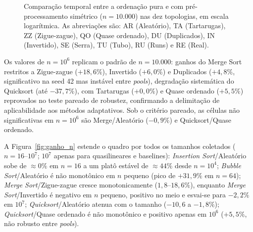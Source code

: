 \documentclass[portuguese]{sbc2025}%
\begin{document}
\begin{figure}[htbp]

\caption{Comparação temporal entre a ordenação pura e com pré-processamento
simétrico ($n=10.000$) nas dez topologias, em escala logarítmica.
As abreviações são: AR (Aleatório), TA (Tartarugas), ZZ (Zigue-zague),
QO (Quase ordenado), DU (Duplicados), IN (Invertido), SE (Serra),
TU (Tubo), RU (Runs) e RE (Real).}
\label{fig:tempos}
\end{figure}

\begin{table}[htbp]
\centering
\caption{Faixa de ganho do pré-processamento por método para vetores de $1.000.000$ de elementos (mínimo e máximo sobre as nove topologias medidas; Real excluído pelo teto do asset nativo). Os valores por célula, com marcas de significância, estão no material suplementar.}
\label{tab:tempos1M}
\small
\setlength{\tabcolsep}{2pt}
%
\end{table}

Os valores de $n{=}10^6$ replicam o padrão de $n{=}10.000$: ganhos do Merge Sort restritos a Zigue-zague ($+18{,}6\%$), Invertido ($+6{,}0\%$) e Duplicados ($+4{,}8\%$, significativo na seed 42 mas instável entre \emph{pools}), degradação sistemática do Quicksort (até $-37{,}7\%$), com Tartarugas ($+0{,}0\%$) e Quase ordenado ($+5{,}5\%$) reprovados no teste pareado de robustez, confirmando a delimitação de aplicabilidade aos métodos adaptativos. Sob o critério pareado, as células não significativas em $n{=}10^6$ são Merge/Aleatório ($-0{,}9\%$) e Quicksort/Quase ordenado.

A Figura~\ref{fig:ganho_n} estende o quadro por todos os tamanhos coletados ($n{=}16$--$10^7$; $10^7$ apenas para quasilineares e baselines): \emph{Insertion Sort}/Aleatório sobe de $\approx0\%$ em $n{=}16$ a um platô estável de $\approx44\%$ desde $n{=}10^4$; \emph{Bubble Sort}/Aleatório é não monotônico em $n$ pequeno (pico de $+31{,}9\%$ em $n{=}64$); \emph{Merge Sort}/Zigue-zague cresce monotonicamente ($1{,}8$--$18{,}6\%$), enquanto \emph{Merge Sort}/Invertido é negativo em $n$ pequeno, positivo no meio e esvai-se para $-2{,}2\%$ em $10^7$; \emph{Quicksort}/Aleatório atenua com o tamanho ($-10{,}6$ a $-1{,}8\%$); \emph{Quicksort}/Quase ordenado é não monotônico e positivo apenas em $10^6$ ($+5{,}5\%$, não robusto entre \emph{pools}).
\end{document}
